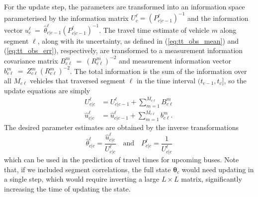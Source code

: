 For the update step, the parameters are transformed into an information
space parameterised by the information matrix $U^\ell_c = (P_{c|c-1}^\ell)^{-1}$
and the information vector $u^\ell_c~=~\hat \theta^\ell_{c|c-1} (P^\ell_{c|c-1})^{-1}$.
The travel time estimate of vehicle $m$ along segment $\ell$,
along with its uncertainty, 
as defined in (\ref{eq:tt_obs_mean}) and (\ref{eq:tt_obs_err}), respectively,
are transformed to a measurement information covariance matrix 
$B_{c\ell}^{m}~=~(R_{c\ell}^m)^{-2}$
and measurement information vector $b_{c\ell}^{m}~=~Z_{c\ell}^{m} (R_{c\ell}^{m})^{-2}$.
The total information is the sum of the information over all $M_{c\ell}$ vehicles
that traversed segment $\ell$ in the time interval $(t_{c-1}, t_c]$,
so the update equations are simply
\begin{align*}
U^\ell_{c|c} &= U^\ell_{c|c-1} + \sum_{m=1}^{M_{c\ell}} B_{c\ell}^{m} \\
\hat u^\ell_{c|c} &= \hat u^\ell_{c|c-1} + \sum_{m=1}^{M_{c\ell}} b_{c\ell}^{m}.
\end{align*}
The desired parameter estimates are obtained 
by the inverse transformations
\begin{equation*}
\hat \theta^\ell_{c|c} = \frac{\hat u^\ell_{c|c}}{U^\ell_{c|c}} 
\quad\text{and}\quad
P^\ell_{c|c} = \frac{1}{U^\ell_{c|c}}
\end{equation*}
which can be used in the prediction of travel times
for upcoming buses. 
Note that, if we included segment correlations,
the full state $\boldsymbol{\theta}_c$ would need updating in a single step,
which would require inverting a large $L\times L$ matrix,
significantly increasing the time of updating the state.



